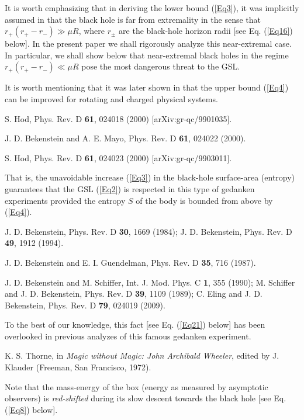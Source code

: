 \documentclass[12pt,preprintnumbers,amsmath,amssymbm,prd]{revtex4-1}
\begin{document}
\begin{thebibliography}{99}
 It is worth emphasizing that in deriving the lower bound (\ref{Eq3}),
it was implicitly assumed in \cite{Bek73} that the black hole is far
from extremality in the sense that $r_+(r_+-r_-)\gg\mu R$, where
$r_{\pm}$ are the black-hole horizon radii [see Eq. (\ref{Eq16})
below]. In the present paper we shall rigorously analyze this
near-extremal case. In particular, we shall show below that
near-extremal black holes in the regime $r_+(r_+-r_-)\ll\mu R$ pose
the most dangerous threat to the GSL.

 It is worth mentioning that it was later shown in \cite{Hodb1,BekMay,Hodb2} that
the upper bound (\ref{Eq4}) can be improved for rotating and charged
physical systems.

 S. Hod, Phys. Rev. D {\bf 61}, 024018 (2000) [arXiv:gr-qc/9901035].

 J. D. Bekenstein and A. E. Mayo, Phys. Rev. D {\bf 61}, 024022 (2000).

 S. Hod, Phys. Rev. D {\bf 61}, 024023 (2000) [arXiv:gr-qc/9903011].

 That is, the unavoidable increase (\ref{Eq3}) in the
black-hole surface-area (entropy) guarantees that the GSL
(\ref{Eq2}) is respected in this type of gedanken experiments
provided the entropy $S$ of the body is bounded from above by
(\ref{Eq4}).

 J. D. Bekenstein, Phys. Rev. D {\bf 30}, 1669 (1984);
J. D. Bekenstein, Phys. Rev. D {\bf 49}, 1912 (1994).

 J. D. Bekenstein and E. I. Guendelman, Phys. Rev. D {\bf 35}, 716
(1987).

 J. D. Bekenstein and M. Schiffer, Int. J. Mod. Phys. C {\bf 1}, 355
(1990); M. Schiffer and J. D. Bekenstein, Phys. Rev. D {\bf 39},
1109 (1989); C. Eling and J. D. Bekenstein, Phys. Rev. D {\bf 79},
024019 (2009).

 To the best of our knowledge, this fact [see Eq. (\ref{Eq21}) below]
has been overlooked in previous analyzes of this famous gedanken
experiment.

 K. S. Thorne, in {\it Magic without Magic: John Archibald Wheeler}, edited by J. Klauder (Freeman,
San Francisco, 1972).

 Note that the mass-energy of the box (energy as measured by asymptotic observers)
is {\it red-shifted} during its slow descent towards the black hole
[see Eq. (\ref{Eq8}) below].


\end{thebibliography}
\end{document}
